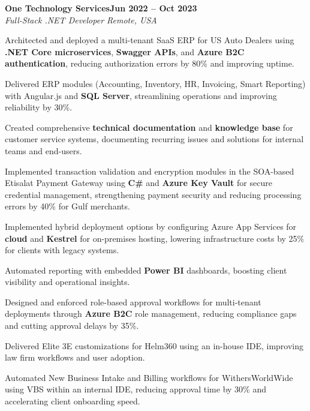 \documentclass[letterpaper,10pt]{article}
\newcommand{\headingBf}[2]{
  \hspace{10pt}\textbf{#1}\hfill\textbf{#2}\\
}
\newcommand{\headingIt}[2]{
  \hspace{10pt}\textit{#1}\hfill\textit{#2}\\
}
\newenvironment{resume_list}{
  \vspace{-7pt}
  \begin{itemize}[itemsep=-2px, parsep=1pt, leftmargin=30pt]
}{
  \end{itemize}
}
\begin{document}
\headingBf{One Technology Services}{Jun 2022 -- Oct 2023}
\headingIt{Full-Stack .NET Developer \hfill Remote, USA}{}
\begin{resume_list}
    \item Architected and deployed a multi-tenant SaaS ERP for US Auto Dealers using \textbf{.NET Core microservices}, \textbf{Swagger APIs}, and \textbf{Azure B2C authentication}, reducing authorization errors by 80\% and improving uptime.
    \item Delivered ERP modules (Accounting, Inventory, HR, Invoicing, Smart Reporting) with Angular.js and \textbf{SQL Server}, streamlining operations and improving reliability by 30\%.
    \item Created comprehensive \textbf{technical documentation} and \textbf{knowledge base} for customer service systems, documenting recurring issues and solutions for internal teams and end-users.
    \item Implemented transaction validation and encryption modules in the SOA-based Etisalat Payment Gateway using \textbf{C\#} and \textbf{Azure Key Vault} for secure credential management, strengthening payment security and reducing processing errors by 40\% for Gulf merchants.
    \item Implemented hybrid deployment options by configuring Azure App Services for \textbf{cloud} and \textbf{Kestrel} for on-premises hosting, lowering infrastructure costs by 25\% for clients with legacy systems.
    \item Automated reporting with embedded \textbf{Power BI} dashboards, boosting client visibility and operational insights.   
    \item Designed and enforced role-based approval workflows for multi-tenant deployments through \textbf{Azure B2C} role management, reducing compliance gaps and cutting approval delays by 35\%.
    \item Delivered Elite 3E customizations for Helm360 using an in-house IDE, improving law firm workflows and user adoption.
    \item Automated New Business Intake and Billing workflows for WithersWorldWide using VBS within an internal IDE, reducing approval time by 30\% and accelerating client onboarding speed.
\end{resume_list}
\end{document}
